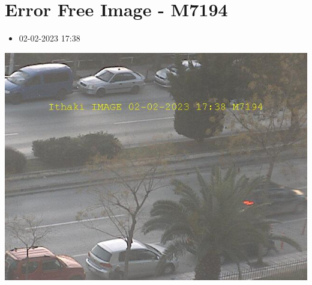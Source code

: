 \documentclass[10pt,a4paper]{article}
\begin{document}
\section*{\textlatin{Error Free Image - M7194}}
\begin{itemize}
  \item 02-02-2023 17:38
\end{itemize}
\begin{center}
  \includegraphics[scale=0.5]{errorFreeImage.png}
  \newline
  \newline
  \newline
  \newline
  \newline
\end{center}
\end{document}
